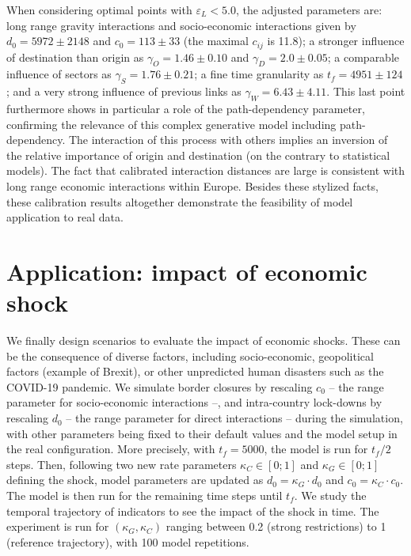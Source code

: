 \documentclass[10pt,letterpaper]{article}
\providecommand{\DIFaddbegin}{} %
\providecommand{\DIFaddend}{} %
\begin{document}
When considering optimal points with $\varepsilon_L < 5.0$, the adjusted parameters are: long range gravity interactions and socio-economic interactions given by $d_0 = 5972 \pm 2148$ and $c_0 = 113 \pm 33$ (the maximal $c_{ij}$ is 11.8); a stronger influence of destination than origin as $\gamma_O = 1.46 \pm 0.10$ and $\gamma_D = 2.0 \pm 0.05$; a comparable influence of sectors as $\gamma_S = 1.76 \pm 0.21$; a fine time granularity as $t_f = 4951 \pm 124$; and a very strong influence of previous links as $\gamma_W = 6.43 \pm 4.11$. This last point furthermore shows in particular a role of the path-dependency parameter, confirming the relevance of this complex generative model including path-dependency. The interaction of this process with others implies an inversion of the relative importance of origin and destination (on the contrary to statistical models). The fact that calibrated interaction distances are large is consistent with long range economic interactions within Europe. Besides these stylized facts, these calibration results altogether demonstrate the feasibility of model application to real data.

\DIFaddbegin 

\DIFaddend \section*{Application: impact of economic shock}

We finally design scenarios to evaluate the impact of economic shocks. These can be the consequence of diverse factors, including socio-economic, geopolitical factors (example of Brexit), or other unpredicted human disasters such as the COVID-19 pandemic. We simulate border closures by rescaling $c_0$ -- the range parameter for socio-economic interactions --, and intra-country lock-downs by rescaling $d_0$ -- the range parameter for direct interactions -- during the simulation, with other parameters being fixed to their default values and the model setup in the real configuration. More precisely, with $t_f = 5000$, the model is run for $t_f / 2$ steps. Then, following two new rate parameters $\kappa_C \in \left[0;1\right]$ and $\kappa_G \in \left[0;1\right]$ defining the shock, model parameters are updated as $d_0 = \kappa_G \cdot d_0$ and $c_0 = \kappa_C \cdot c_0$. The model is then run for the remaining time steps until $t_f$. We study the temporal trajectory of indicators to see the impact of the shock in time. The experiment is run for $(\kappa_G,\kappa_C)$ ranging between 0.2 (strong restrictions) to 1 (reference trajectory), with 100 model repetitions.
\end{document}
